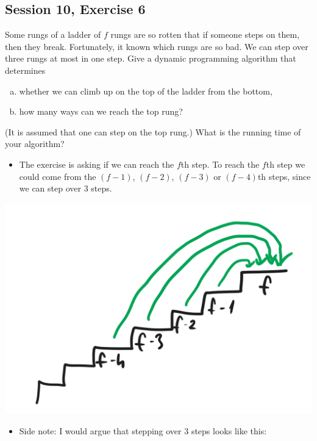 \subsection {Session 10, Exercise 6}


Some rungs of a ladder of $f$ rungs are so rotten that if someone steps on them, then they break. Fortunately, it known which rungs are so bad. We can step over three rungs at most in one step. Give a dynamic programming algorithm that determines

\begin{enumerate}[a)]
    \item whether we can climb up on the top of the ladder from the bottom,
    \item how many ways can we reach the top rung?
\end{enumerate}

(It is assumed that one can step on the top rung.) What is the running time of your algorithm?


\begin{itemize}
    \item The exercise is asking if we can reach the $f$th step. To reach the $f$th step we could come from the $(f-1)$, $(f-2)$, $(f-3)$ or $(f-4)$th steps, since we can step over $3$ steps.
\end{itemize}

\begin{center}
\includegraphics[width=0.7\linewidth]{10/06/ladder_steps.png}
\end{center}

\begin{itemize}
    \item Side note: I would argue that stepping over 3 steps looks like this:
\end{itemize}

